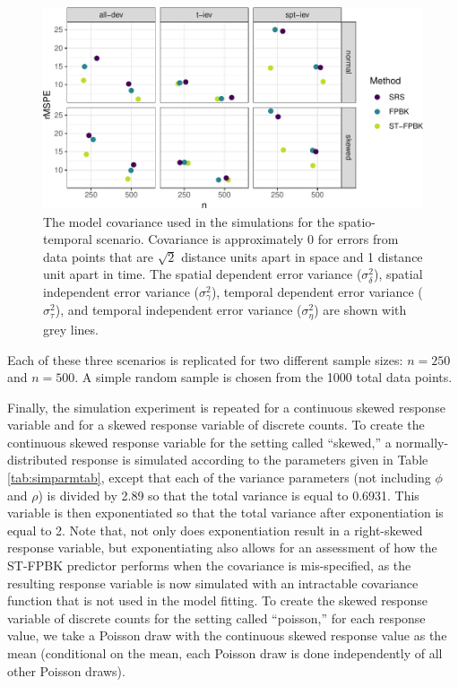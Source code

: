 \documentclass[smallextended]{svjour3}       %
\begin{document}
\begin{figure}
\centering
\includegraphics{preprint_springer_files/figure-latex/unnamed-chunk-17-1.pdf}
\caption{\label{fig:simcovplot} The model covariance used in the
simulations for the spatio-temporal scenario. Covariance is
approximately 0 for errors from data points that are \(\sqrt2\) distance
units apart in space and 1 distance unit apart in time. The spatial
dependent error variance (\(\sigma^2_{\delta}\)), spatial independent
error variance (\(\sigma^2_{\gamma}\)), temporal dependent error
variance (\(\sigma^2_{\tau}\)), and temporal independent error variance
(\(\sigma^2_{\eta}\)) are shown with grey lines.}
\end{figure}

Each of these three scenarios is replicated for two different sample
sizes: \(n = 250\) and \(n = 500\). A simple random sample is chosen
from the 1000 total data points.

Finally, the simulation experiment is repeated for a continuous skewed
response variable and for a skewed response variable of discrete counts.
To create the continuous skewed response variable for the setting called
``skewed,'' a normally-distributed response is simulated according to
the parameters given in Table \ref{tab:simparmtab}, except that each of
the variance parameters (not including \(\phi\) and \(\rho\)) is divided
by 2.89 so that the total variance is equal to 0.6931. This variable is
then exponentiated so that the total variance after exponentiation is
equal to 2. Note that, not only does exponentiation result in a
right-skewed response variable, but exponentiating also allows for an
assessment of how the ST-FPBK predictor performs when the covariance is
mis-specified, as the resulting response variable is now simulated with
an intractable covariance function that is not used in the model
fitting. To create the skewed response variable of discrete counts for
the setting called ``poisson,'' for each response value, we take a
Poisson draw with the continuous skewed response value as the mean
(conditional on the mean, each Poisson draw is done independently of all
other Poisson draws).
\end{document}
